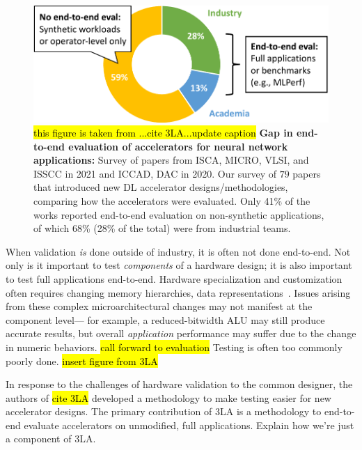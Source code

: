 \begin{figure}
\centering
\includegraphics[width=.6\textwidth]{assets/3la-pie.pdf}
\caption{
\hl{this figure is taken from ...cite 3LA...update caption}
\textbf{Gap in end-to-end evaluation of accelerators for neural network applications:} 
Survey of papers from ISCA, MICRO, VLSI, and ISSCC in 2021 and ICCAD, DAC in 2020.
Our survey of $79$ papers  that introduced new DL accelerator designs/methodologies, comparing how the accelerators were evaluated. Only 41\% of the works reported end-to-end evaluation on non-synthetic applications, of which 68\% (28\% of the total) were from industrial teams.
}
\label{fig:3la-pie}
\end{figure}


  
When validation \textit{is} done
  outside of industry,
  it is often not done end-to-end.
Not only is it important
  to test \textit{components}
  of a hardware design;
  it is also important
  to test full applications end-to-end.
Hardware specialization and customization often
  requires changing memory hierarchies,
  data representations~\cite{chan2014itrs,fang2019understanding,lai2021programming}.
Issues arising from these complex
  microarchitectural changes
  may not manifest
  at the component level---%
  for example, a reduced-bitwidth
  ALU
  may still produce accurate results,
  but overall \textit{application}
  performance
  may suffer
  due to the change in numeric behaviors.
\hl{call forward to evaluation}
Testing is often 
  too commonly poorly done.
\hl{insert figure from 3LA}


In response to the challenges
  of hardware validation
  to the common designer,
  the authors of \hl{cite 3LA}
  developed
  a methodology
  to make testing
  easier for new accelerator designs.
The primary contribution of 3LA
  is 
  a methodology to end-to-end evaluate accelerators on unmodified, full applications.
Explain how we're just a component of 3LA.

